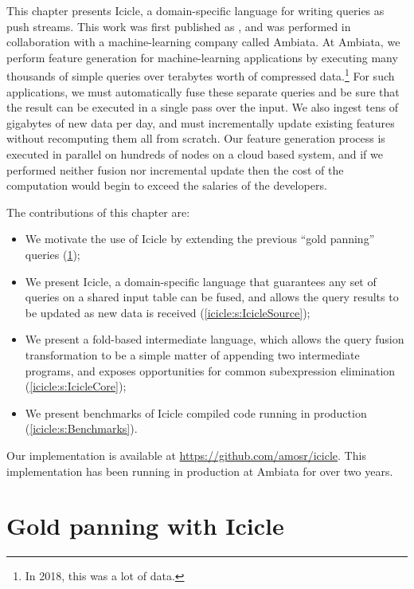 \label{icicle:s:Introduction}

This chapter presents Icicle, a domain-specific language for writing queries as push streams.
This work was first published as \citet{robinson2016icicle}, and was performed in collaboration with a machine-learning company called Ambiata.
At Ambiata, we perform feature generation for machine-learning applications by executing many thousands of simple queries over terabytes worth of compressed data.\footnote{In 2018, this was a lot of data.}
For such applications, we must automatically fuse these separate queries and be sure that the result can be executed in a single pass over the input.
We also ingest tens of gigabytes of new data per day, and must incrementally update existing features without recomputing them all from scratch.
Our feature generation process is executed in parallel on hundreds of nodes on a cloud based system, and if we performed neither fusion nor incremental update then the cost of the computation would begin to exceed the salaries of the developers.

The contributions of this chapter are:
\begin{itemize}
\item
  We motivate the use of Icicle by extending the previous ``gold panning'' queries (\cref{icicle/gold-panning});

\item
  We present Icicle, a domain-specific language that guarantees any set of queries on a shared input table can be fused, and allows the query results to be updated as new data is received (\cref{icicle:s:IcicleSource});

\item
  We present a fold-based intermediate language, which allows the query fusion transformation to be a simple matter of appending two intermediate programs, and exposes opportunities for common subexpression elimination (\cref{icicle:s:IcicleCore});

\item
  We present benchmarks of Icicle compiled code running in production (\cref{icicle:s:Benchmarks}). 
\end{itemize}

Our implementation is available at \url{https://github.com/amosr/icicle}.
This implementation has been running in production at Ambiata for over two years.

\section{Gold panning with Icicle}
\label{icicle/gold-panning}

